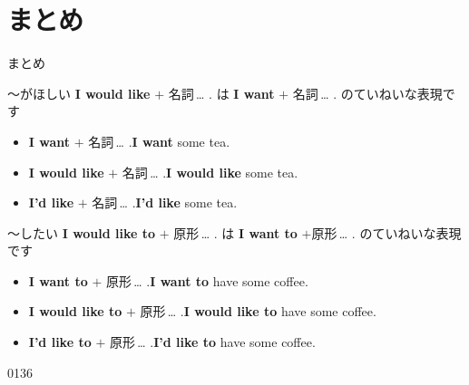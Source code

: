 \documentclass[aspectratio=169,xcolor={dvipsnames,table}]{beamer}
\begin{document}
\section{まとめ}
\begin{frame}[plain]{まとめ}
 \begin{block}{～がほしい}\small
\textbf{I would like} $+$ 名詞\,\ldots\,\,.\,\,は\,\,\textbf{I want} $+$ 名詞\,\ldots\,\,.\,\,のていねいな表現です
\begin{itemize}[square]\small
 \item \textbf{I want} $+$ 名詞\,\ldots\,\,.\hfill{\scriptsize \textbf{I want} some tea.}
 \item \textbf{I would like} $+$ 名詞\,\ldots\,\,.\hfill{\scriptsize \textbf{I would like} some tea.}
 \item \textbf{I'd like} $+$ 名詞\,\ldots\,\,.\hfill{\scriptsize \textbf{I'd like} some tea.}
       \end{itemize}
\end{block}

\begin{block}{～したい}\small
\textbf{I would like to} $+$ 原形\,\ldots\,\,.\,\,は\,\,\textbf{I want to} $+$原形\,\ldots\,\,.\,\,のていねいな表現です
\begin{itemize}[square]\small
 \item \textbf{I want to} $+$ 原形\,\ldots\,\,.\hfill{\scriptsize \textbf{I want to} have some coffee.}
 \item \textbf{I would like to} $+$ 原形\,\ldots\,\,.\hfill{\scriptsize \textbf{I would like to} have some coffee.}
 \item \textbf{I'd like to} $+$ 原形\,\ldots\,\,.\hfill{\scriptsize \textbf{I'd like to} have some coffee.}
       \end{itemize}
\end{block}

\hfill{\tiny 0136}\,{\scriptsize {}}

\end{frame}
\end{document}
